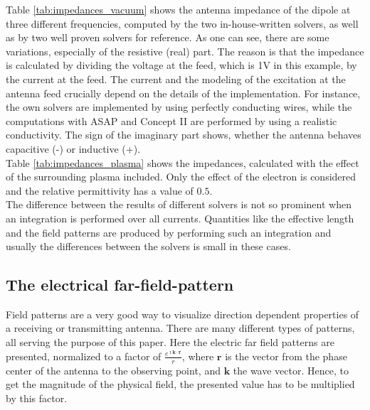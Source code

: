 \documentclass[two-column,ras]{agutex}
\begin{document}
\begin{article}
Table \ref{tab:impedances_vacuum} shows the antenna impedance of the dipole at three different frequencies, computed by the two in-house-written solvers, as well as by two well proven solvers for reference. As one can see, there are some variations, especially of the resistive (real) part. The reason is that the impedance is calculated by dividing the voltage at the feed, which is 1V in this example, by the current at the feed. The current and the modeling of the excitation at the antenna feed crucially depend on the details of the implementation. For instance, the own solvers are implemented by using perfectly conducting wires, while the computations with ASAP and Concept II are performed by using a realistic conductivity. The sign of the imaginary part shows, whether the antenna behaves capacitive (-) or inductive (+).\\

Table \ref{tab:impedances_plasma} shows the impedances, calculated with the effect of the surrounding plasma included. Only the effect of the electron is considered and the relative permittivity has a value of $0.5$.\\

The difference between the results of different solvers is not so prominent when an integration is performed over all currents. Quantities like the effective length and the field patterns are produced by performing such an integration and usually the differences between the solvers is small in these cases.\\


\subsection{The electrical far-field-pattern}
Field patterns are a very good way to visualize direction dependent properties of a receiving or transmitting antenna. There are many different types of patterns, all serving the purpose of this paper. Here the electric far field patterns are presented, normalized to a factor of $\frac{e^{\imath \mathbf{k}\cdot \mathbf{r}}}{r}$, where $\mathbf{r}$ is the vector from the phase center of the antenna to the observing point, and $\mathbf{k}$ the wave vector. Hence, to get the magnitude of the physical field, the presented value has to be multiplied by this factor.\\


\end{article}
\end{document}
